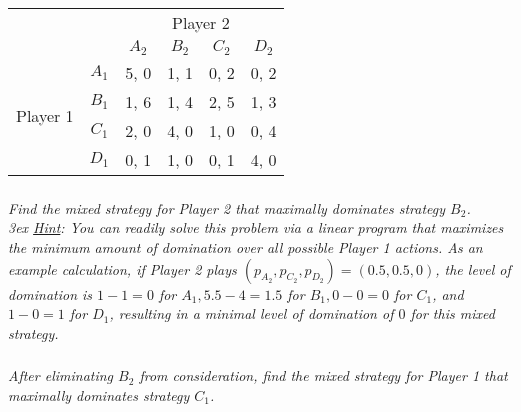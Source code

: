 \documentclass[12pt]{amsart}
\begin{document}
\begin{center}
	\def\arraystretch{1.25}%
	\begin{tabular}{cccccc}
		&                            &                            & \multicolumn{2}{c}{Player 2}                            &                            \\
		& \multicolumn{1}{c|}{}      & \multicolumn{1}{c|}{$A_2$} & \multicolumn{1}{c|}{$B_2$} & \multicolumn{1}{c|}{$C_2$} & \multicolumn{1}{c|}{$D_2$} \\ \cline{2-6} 
		& \multicolumn{1}{c|}{$A_1$} & \multicolumn{1}{c|}{5, 0}  & \multicolumn{1}{c|}{1, 1}  & \multicolumn{1}{c|}{0, 2}  & \multicolumn{1}{c|}{0, 2}  \\ \cline{2-6} 
		\multirow{2}{*}{Player 1} & \multicolumn{1}{c|}{$B_1$} & \multicolumn{1}{c|}{1, 6}  & \multicolumn{1}{c|}{1, 4}  & \multicolumn{1}{c|}{2, 5}  & \multicolumn{1}{c|}{1, 3}  \\ \cline{2-6} 
		& \multicolumn{1}{c|}{$C_1$} & \multicolumn{1}{c|}{2, 0}  & \multicolumn{1}{c|}{4, 0}  & \multicolumn{1}{c|}{1, 0}  & \multicolumn{1}{c|}{0, 4}  \\ \cline{2-6} 
		& \multicolumn{1}{c|}{$D_1$} & \multicolumn{1}{c|}{0, 1}  & \multicolumn{1}{c|}{1, 0}  & \multicolumn{1}{c|}{0, 1}  & \multicolumn{1}{c|}{4, 0}  \\ \cline{2-6} 
	\end{tabular}
\end{center}

	\subsubsection{}
	\textit{Find the mixed strategy for Player 2 that maximally dominates strategy $B_2$. \\3ex %
%
	\underline{Hint}: You can readily solve this problem via a linear program that maximizes the
	minimum amount of domination over all possible Player 1 actions. As an example
	calculation, if Player 2 plays $(p_{A_2},p_{C_2},p_{D_2}) = (0.5,0.5,0)$, 
	the level of domination is $1 − 1 = 0$ for $A_1, 5.5 - 4 = 1.5$ for 
	$B_1, 0 - 0 = 0$ for $C_1$, and $1 − 0 = 1$ for $D_1$, resulting in a
	minimal level of domination of $0$ for this mixed strategy.}

	\subsubsection{}
	\textit{After eliminating $B_2$ from consideration, find the mixed strategy for Player 1 that
	maximally dominates strategy $C_1$.}
\end{document}
